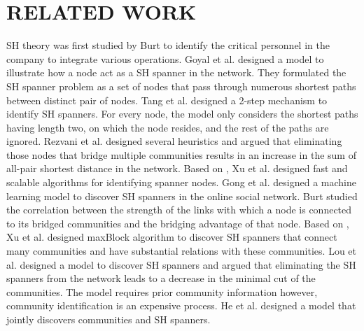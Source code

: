 \section{RELATED WORK}
SH theory was first studied by Burt \cite{burt2009structural} to identify the critical personnel in the company to integrate various operations. Goyal et al. \cite{goyal2007structural} designed a model to illustrate how a node act as a SH spanner in the network. They formulated the SH spanner problem as a set of nodes that pass through numerous shortest paths between distinct pair of nodes. Tang et al. \cite{tang2012inferring} designed a 2-step mechanism to identify SH spanners. For every node, the model only considers the shortest paths having length two, on which the node resides, and the rest of the paths are ignored. Rezvani et al. \cite{rezvani2015identifying} designed several heuristics and argued that eliminating those nodes that bridge multiple communities results in an increase in the sum of all-pair shortest distance in the network. Based on \cite{rezvani2015identifying}, Xu et al. \cite{xu2017efficient} designed fast and scalable algorithms for identifying spanner nodes. Gong et al. \cite{gong2019identifying} designed a machine learning model to discover SH spanners in the online social network. Burt \cite{ burt2011structural} studied the correlation between the strength of the links with which a node is connected to its bridged communities and the bridging advantage of that node. Based on \cite{burt2011structural}, Xu et al. \cite{xu2019identifying} designed maxBlock algorithm to discover SH spanners that connect many communities and have substantial relations with these communities. Lou et al. \cite{lou2013mining} designed a model to discover SH spanners and argued that eliminating the SH spanners from the network leads to a decrease in the minimal cut of the communities. The model requires prior community information however, community identification is an expensive process. He et al. \cite{he2016joint} designed a model that jointly discovers communities and SH spanners.